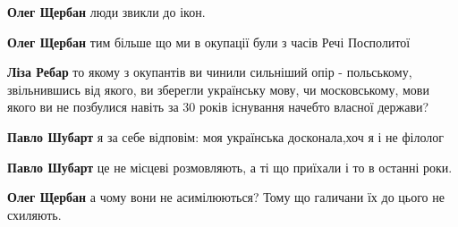 \begin{itemize}
\begin{itemize}
 
\textbf{Олег Щербан} люди звикли до ікон.

 
\textbf{Олег Щербан} тим більше що ми в окупації були з часів Речі Посполитої

 
\textbf{Ліза Ребар} то якому з окупантів ви чинили сильніший опір - польському, звільнившись від якого, ви зберегли українську мову, чи московському, мови якого ви не позбулися навіть за 30 років існування начебто власної держави?

 
\textbf{Павло Шубарт} я за себе відповім: моя українська досконала,хоч я і не філолог

 
\textbf{Павло Шубарт} це не місцеві розмовляють, а ті що приїхали і то в останні роки.

 
\textbf{Олег Щербан} а чому вони не асимілюються? Тому що галичани їх до цього не схиляють.


\end{itemize}
\end{itemize}
